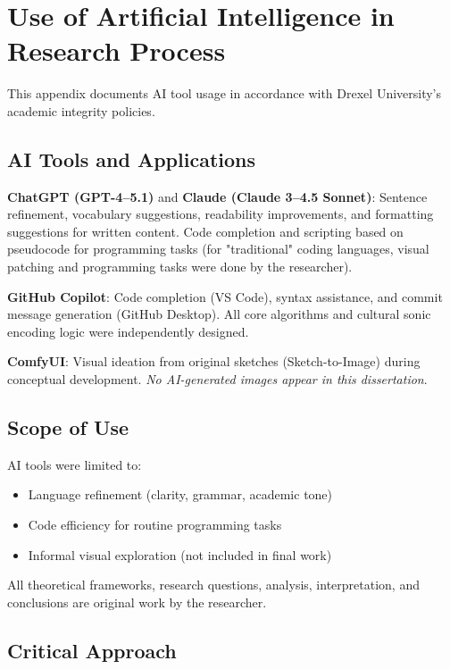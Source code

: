 \section*{Use of Artificial Intelligence in Research Process}
\label{appendix:use_of_ai}

This appendix documents AI tool usage in accordance with Drexel University's academic integrity policies.

\subsection*{AI Tools and Applications}

\textbf{ChatGPT (GPT-4–5.1)} and \textbf{Claude (Claude 3–4.5 Sonnet)}: Sentence refinement, vocabulary suggestions, readability improvements, and formatting suggestions for written content. Code completion and scripting based on pseudocode for programming tasks (for "traditional" coding languages, visual patching and programming tasks were done by the researcher).

\textbf{GitHub Copilot}: Code completion (VS Code), syntax assistance, and commit message generation (GitHub Desktop). All core algorithms and cultural sonic encoding logic were independently designed.

\textbf{ComfyUI}: Visual ideation from original sketches (Sketch-to-Image) during conceptual development. \textit{No AI-generated images appear in this dissertation}.

\subsection*{Scope of Use}

AI tools were limited to:
\begin{itemize}[noitemsep]
	\item Language refinement (clarity, grammar, academic tone)
	\item Code efficiency for routine programming tasks
	\item Informal visual exploration (not included in final work)
\end{itemize}

All theoretical frameworks, research questions, analysis, interpretation, and conclusions are original work by the researcher.

\subsection*{Critical Approach}

